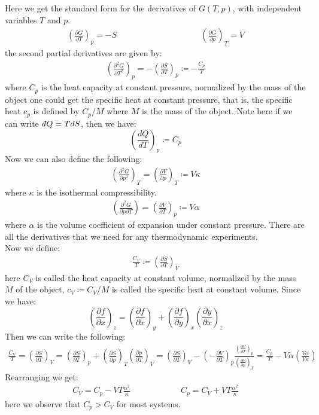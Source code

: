 \documentclass[11pt,oneside]{book}
\theoremstyle{break}
\theoremstyle{break}
\newcommand{\pd}{\partial}
\newcommand{\lr}[1]{\left( #1 \right)}
\newcommand{\dbar}{d\hspace*{-0.08em}\bar{}\hspace*{0.1em}}
\begin{document}
Here we get the standard form for the derivatives of $G(T,p)$, with independent variables $T$ and $p$.
\begin{align*}
\lr{\frac{\pd G}{\pd T}}_p = -S\qquad\qquad\qquad\qquad\qquad \lr{\frac{\pd G}{\pd p}}_T = V
\end{align*}
the second partial derivatives are given by:
\begin{align*}
\lr{\frac{\pd^2 G}{\pd T^2}}_p = -\lr{\frac{\pd S}{\pd T}}_p \coloneqq -\frac{C_p}{T}
\end{align*}
where $C_p$ is the heat capacity at constant pressure, normalized by the mass of the object one could get the specific heat at constant pressure, that is, the specific heat $c_p$ is defined by $C_p/M$ where $M$ is the mass of the object. Note here if we can write $\dbar Q = T dS$, then we have: 
$$\lr{\frac{dQ}{dT}}_p \coloneqq C_p$$
Now we can also define the following:
\begin{align*}
\lr{\frac{\pd^2 G}{\pd p^2}}_T = \lr{\frac{\pd V}{\pd p}}_T \coloneqq V\kappa
\end{align*}
where $\kappa$ is the isothermal compressibility.\\
\begin{align*}
\lr{\frac{\pd^2 G}{\pd p \pd T}} = \lr{\frac{\pd V}{\pd T}}_p \coloneqq V\alpha
\end{align*}
where $\alpha$ is the volume coefficient of expansion under constant pressure. There are all the derivatives that we need for any thermodynamic experiments. \\


Now we define:
\begin{align*}
\frac{C_V}{T} \coloneqq \lr{\frac{\pd S}{\pd T}}_V 
\end{align*}
here $C_V$ is called the heat capacity at constant volume, normalized by the mass $M$ of the object, $c_V \coloneqq C_V/M$ is called the specific heat at constant volume. Since we have: 
$$\lr{\frac{\pd f}{\pd x}}_z = \lr{\frac{\pd f}{\pd x}}_y + \lr{\frac{\pd f}{\pd y}}_x\lr{\frac{\pd y}{\pd x}}_z$$
Then we can write the following:
\begin{align*}
\frac{C_V}{T} = \lr{\frac{\pd S}{\pd T}}_V = \lr{\frac{\pd S}{\pd T}}_p + \lr{\frac{\pd S}{\pd p}}_T \lr{\frac{\pd p}{\pd T}}_V
= \lr{\frac{\pd S}{\pd T}}_V -\lr{-\frac{\pd V}{\pd T}}_p \frac{\lr{\frac{\pd V}{\pd T}}_p}{\lr{\frac{\pd V}{\pd p}}_T} = \frac{C_p}{T} -V\alpha \left(\frac{V\alpha}{V\kappa} \right) 
\end{align*}
Rearranging we get:
\begin{align*}
C_V = C_p - VT \frac{\alpha^2}{\kappa} \qquad\qquad\qquad C_p = C_V + VT\frac{\alpha^2}{\kappa}
\end{align*}
here we observe that $C_p > C_V$ for most systems. \\
\end{document}
